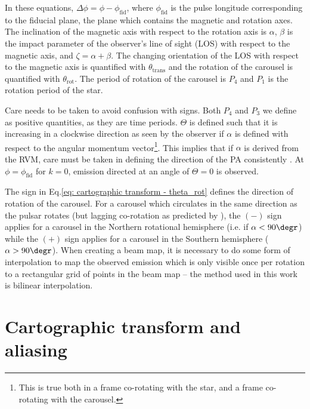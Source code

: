 In these equations, $\Delta\phi = \phi - \phi_\mathrm{fid}$, where $\phi_\mathrm{fid}$ is the pulse longitude corresponding to the fiducial plane, the plane which contains the magnetic and rotation axes. The inclination of the magnetic axis with respect to the rotation axis is $\alpha$, $\beta$ is the impact parameter of the observer's line of sight (LOS) with respect to the magnetic axis, and $\zeta = \alpha + \beta$. The changing orientation of the LOS with respect to the magnetic axis is quantified with $\theta_\mathrm{trans}$ and the rotation of the carousel is quantified with $\theta_\mathrm{rot}$. The period of rotation of the carousel is $P_4$ and $P_1$ is the rotation period of the star. 

Care needs to be taken to avoid confusion with signs. Both $P_4$ and $P_3$ we define as positive quantities, as they are time periods. $\Theta$ is defined such that it is increasing in a clockwise direction as seen by the observer if $\alpha$ is defined with respect to the angular momentum vector\footnote{This is true both in a frame co-rotating with the star, and a frame co-rotating with the carousel.}. This implies that if $\alpha$ is derived from the RVM, care must be taken in defining the direction of the PA consistently \citep[see][]{EWxx2001}. At $\phi = \phi_\mathrm{fid}$ for $k = 0$, emission directed at an angle of $\Theta = 0$ is observed.

The sign in Eq.\eqref{eq: cartographic transform - theta_rot} defines the direction of rotation of the carousel. For a carousel which circulates in the same direction as the pulsar rotates (but lagging co-rotation as predicted by \citep{RSxx1975}), the $(-)$ sign applies for a carousel in the Northern rotational hemisphere (i.e. if $\alpha < 90\degr$) while the $(+)$ sign applies for a carousel in the Southern hemisphere ($\alpha > 90\degr$).  When creating a beam map, it is necessary to do some form of interpolation to map the observed emission which is only visible once per rotation to a rectangular grid of points in the beam map -- the method used in this work is bilinear interpolation.








\section{Cartographic transform and aliasing}
\label{app: B0031temp - carousel aliasing}

